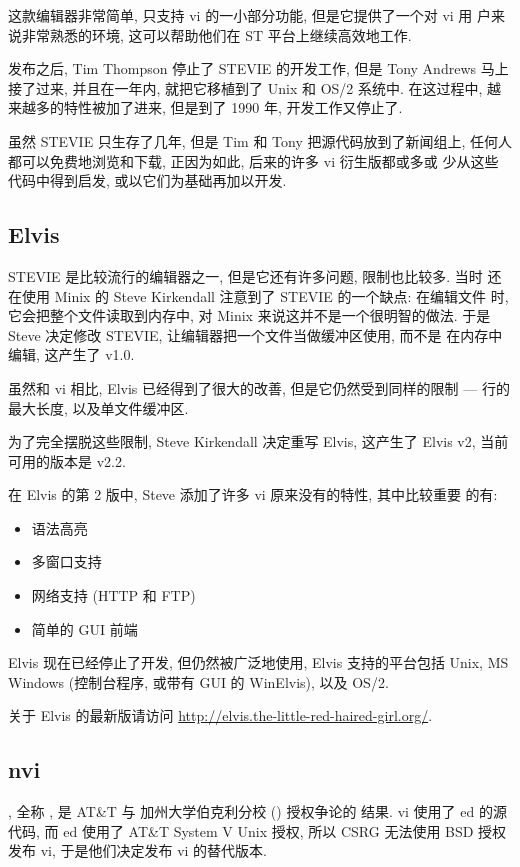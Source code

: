 这款编辑器非常简单, 只支持 vi 的一小部分功能, 但是它提供了一个对 vi 用
户来说非常熟悉的环境, 这可以帮助他们在 ST 平台上继续高效地工作.

发布之后, Tim Thompson 停止了 STEVIE 的开发工作, 但是 Tony Andrews 马上
接了过来, 并且在一年内, 就把它移植到了 Unix 和 OS/2 系统中. 在这过程中,
越来越多的特性被加了进来, 但是到了 1990 年, 开发工作又停止了.

虽然 STEVIE 只生存了几年, 但是 Tim 和 Tony 把源代码放到了新闻组上,
任何人都可以免费地浏览和下载, 正因为如此, 后来的许多 vi 衍生版都或多或
少从这些代码中得到启发, 或以它们为基础再加以开发.

\subsection{Elvis}
\label{subsec:elvis}
STEVIE 是比较流行的编辑器之一, 但是它还有许多问题, 限制也比较多. 当时
还在使用 Minix 的 Steve Kirkendall 注意到了 STEVIE 的一个缺点: 在编辑文件
时, 它会把整个文件读取到内存中, 对 Minix 来说这并不是一个很明智的做法.
于是 Steve 决定修改 STEVIE, 让编辑器把一个文件当做缓冲区使用, 而不是
在内存中编辑, 这产生了  v1.0.

虽然和 vi 相比, Elvis 已经得到了很大的改善, 但是它仍然受到同样的限制
--- 行的最大长度, 以及单文件缓冲区.

为了完全摆脱这些限制, Steve Kirkendall 决定重写 Elvis, 这产生了 Elvis
v2, 当前可用的版本是 v2.2.

在 Elvis 的第 2 版中, Steve 添加了许多 vi 原来没有的特性, 其中比较重要
的有:
\begin{itemize}
\item 语法高亮
\item 多窗口支持
\item 网络支持 (HTTP 和 FTP)
\item 简单的 GUI 前端
\end{itemize}
Elvis 现在已经停止了开发, 但仍然被广泛地使用, Elvis 支持的平台包括
Unix, MS Windows (控制台程序, 或带有 GUI 的 WinElvis), 以及 OS/2.
\begin{warning}
关于 Elvis 的最新版请访问
\url{http://elvis.the-little-red-haired-girl.org/}.
\end{warning}

\subsection{nvi}
\label{subsec:nvi}
, 全称 , 是 AT\&T 与 加州大学伯克利分校
 () 授权争论的
结果. vi 使用了 ed 的源代码, 而 ed 使用了 AT\&T System V Unix 授权,
所以 CSRG 无法使用 BSD 授权发布 vi, 于是他们决定发布 vi 的替代版本.

